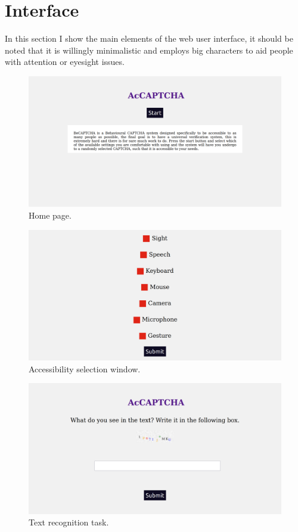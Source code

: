 \section{Interface}
In this section I show the main elements of the web user interface, it should be noted that it is willingly minimalistic and employs big characters to aid people with attention or eyesight issues.

\begin{figure}[h!t]
    \centering
    \includegraphics[scale=0.17]{assets/images/home.png}
    \caption{Home page.}
    \label{fig:gui:home}
\end{figure}

\begin{figure}[h!t]
    \centering
    \includegraphics[scale=0.17]{assets/images/configure.png}
    \caption{Accessibility selection window.}
    \label{fig:gui:configure}
\end{figure}

\begin{figure}[h!t]
    \centering
    \includegraphics[scale=0.17]{assets/images/text_recognition.png}
    \caption{Text recognition task.}
    \label{fig:gui:text_recognition}
\end{figure}

